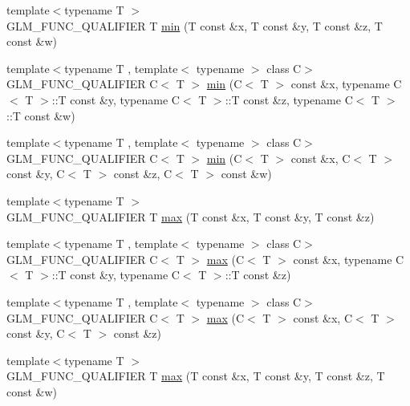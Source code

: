 \begin{DoxyCompactItemize}
\item 
{\footnotesize template$<$typename T $>$ }\\G\+L\+M\+\_\+\+F\+U\+N\+C\+\_\+\+Q\+U\+A\+L\+I\+F\+I\+E\+R T \hyperlink{group__gtx__extented__min__max_ga95466987024d03039607f09e69813d69}{min} (T const \&x, T const \&y, T const \&z, T const \&w)
\item 
{\footnotesize template$<$typename T , template$<$ typename $>$ class C$>$ }\\G\+L\+M\+\_\+\+F\+U\+N\+C\+\_\+\+Q\+U\+A\+L\+I\+F\+I\+E\+R C$<$ T $>$ \hyperlink{group__gtx__extented__min__max_ga4fe35dd31dd0c45693c9b60b830b8d47}{min} (C$<$ T $>$ const \&x, typename C$<$ T $>$\+::T const \&y, typename C$<$ T $>$\+::T const \&z, typename C$<$ T $>$\+::T const \&w)
\item 
{\footnotesize template$<$typename T , template$<$ typename $>$ class C$>$ }\\G\+L\+M\+\_\+\+F\+U\+N\+C\+\_\+\+Q\+U\+A\+L\+I\+F\+I\+E\+R C$<$ T $>$ \hyperlink{group__gtx__extented__min__max_ga7471ea4159eed8dd9ea4ac5d46c2fead}{min} (C$<$ T $>$ const \&x, C$<$ T $>$ const \&y, C$<$ T $>$ const \&z, C$<$ T $>$ const \&w)
\item 
{\footnotesize template$<$typename T $>$ }\\G\+L\+M\+\_\+\+F\+U\+N\+C\+\_\+\+Q\+U\+A\+L\+I\+F\+I\+E\+R T \hyperlink{group__gtx__extented__min__max_ga04991ccb9865c4c4e58488cfb209ce69}{max} (T const \&x, T const \&y, T const \&z)
\item 
{\footnotesize template$<$typename T , template$<$ typename $>$ class C$>$ }\\G\+L\+M\+\_\+\+F\+U\+N\+C\+\_\+\+Q\+U\+A\+L\+I\+F\+I\+E\+R C$<$ T $>$ \hyperlink{group__gtx__extented__min__max_gae1b7bbe5c91de4924835ea3e14530744}{max} (C$<$ T $>$ const \&x, typename C$<$ T $>$\+::T const \&y, typename C$<$ T $>$\+::T const \&z)
\item 
{\footnotesize template$<$typename T , template$<$ typename $>$ class C$>$ }\\G\+L\+M\+\_\+\+F\+U\+N\+C\+\_\+\+Q\+U\+A\+L\+I\+F\+I\+E\+R C$<$ T $>$ \hyperlink{group__gtx__extented__min__max_gaf832e9d4ab4826b2dda2fda25935a3a4}{max} (C$<$ T $>$ const \&x, C$<$ T $>$ const \&y, C$<$ T $>$ const \&z)
\item 
{\footnotesize template$<$typename T $>$ }\\G\+L\+M\+\_\+\+F\+U\+N\+C\+\_\+\+Q\+U\+A\+L\+I\+F\+I\+E\+R T \hyperlink{group__gtx__extented__min__max_ga78e04a0cef1c4863fcae1a2130500d87}{max} (T const \&x, T const \&y, T const \&z, T const \&w)

\end{DoxyCompactItemize}
